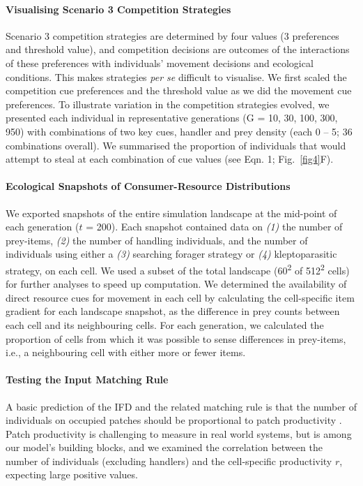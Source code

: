 \begin{refsection}[sorting=nyt]
\paragraph{Visualising Scenario 3 Competition Strategies}

Scenario 3 competition strategies are determined by four values (3 preferences and threshold value), and competition decisions are outcomes of the interactions of these preferences with individuals' movement decisions and ecological conditions.
This makes strategies \textit{per se} difficult to visualise.
We first scaled the competition cue preferences and the threshold value as we did the movement cue preferences.
To illustrate variation in the competition strategies evolved, we presented each individual in representative generations (G = 10, 30, 100, 300, 950) with combinations of two key cues, handler and prey density (each 0 -- 5; 36 combinations overall).
We summarised the proportion of individuals that would attempt to steal at each combination of cue values (see Eqn. 1; Fig.~\ref{fig4}F).

\paragraph{Ecological Snapshots of Consumer-Resource Distributions}

We exported snapshots of the entire simulation landscape at the mid-point of each generation ($t$ = 200).
Each snapshot contained data on \textit{(1)} the number of prey-items, \textit{(2)} the number of handling individuals, and the number of individuals using either a \textit{(3)} searching forager strategy or \textit{(4)} kleptoparasitic strategy, on each cell.
We used a subset of the total landscape (60\textsuperscript{2} of 512\textsuperscript{2} cells) for further analyses to speed up computation.
We determined the availability of direct resource cues for movement in each cell by calculating the cell-specific item gradient for each landscape snapshot, as the difference in prey counts between each cell and its neighbouring cells.
For each generation, we calculated the proportion of cells from which it was possible to sense differences in prey-items, i.e., a neighbouring cell with either more or fewer items.

\paragraph{Testing the Input Matching Rule}

A basic prediction of the IFD and the related matching rule is that the number of individuals on occupied patches should be proportional to patch productivity \citep{fretwell1970,parker1978,houston2008}.
Patch productivity is challenging to measure in real world systems, but is among our model's building blocks, and we examined the correlation between the number of individuals (excluding handlers) and the cell-specific productivity $r$, expecting large positive values.


\end{refsection}
